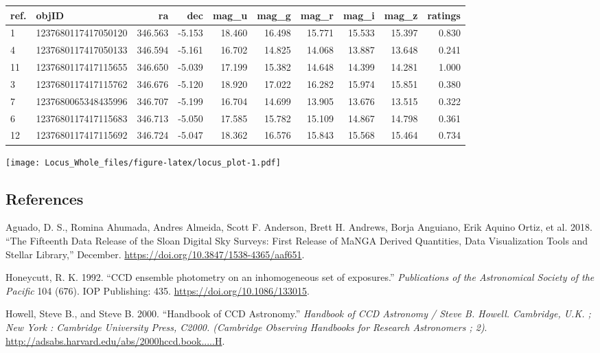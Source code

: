 \documentclass[]{elsarticle} %
\makeatletter
\def\maxwidth{\ifdim\Gin@nat@width>\linewidth\linewidth
\else\Gin@nat@width\fi}
\let\Oldincludegraphics\includegraphics
\renewcommand{\includegraphics}[1]{\Oldincludegraphics[width=\maxwidth]{#1}}
\makeatother
\begin{document}
\begin{tabular}{l|l|r|r|r|r|r|r|r|r}
\hline
ref. & objID & ra & dec & mag\_u & mag\_g & mag\_r & mag\_i & mag\_z & ratings\\
\hline
1 & 1237680117417050120 & 346.563 & -5.153 & 18.460 & 16.498 & 15.771 & 15.533 & 15.397 & 0.830\\
\hline
4 & 1237680117417050133 & 346.594 & -5.161 & 16.702 & 14.825 & 14.068 & 13.887 & 13.648 & 0.241\\
\hline
11 & 1237680117417115655 & 346.650 & -5.039 & 17.199 & 15.382 & 14.648 & 14.399 & 14.281 & 1.000\\
\hline
3 & 1237680117417115762 & 346.676 & -5.120 & 18.920 & 17.022 & 16.282 & 15.974 & 15.851 & 0.380\\
\hline
7 & 1237680065348435996 & 346.707 & -5.199 & 16.704 & 14.699 & 13.905 & 13.676 & 13.515 & 0.322\\
\hline
6 & 1237680117417115683 & 346.713 & -5.050 & 17.585 & 15.782 & 15.109 & 14.867 & 14.798 & 0.361\\
\hline
12 & 1237680117417115692 & 346.724 & -5.047 & 18.362 & 16.576 & 15.843 & 15.568 & 15.464 & 0.734\\
\hline
\end{tabular}

\texttt{[image: Locus\_Whole\_files/figure-latex/locus\_plot-1.pdf]}

\newpage

\hypertarget{references}{%
\subsection*{References}\label{references}}

\hypertarget{refs}{}
\leavevmode\hypertarget{ref-Aguado2018}{}%
Aguado, D. S., Romina Ahumada, Andres Almeida, Scott F. Anderson, Brett
H. Andrews, Borja Anguiano, Erik Aquino Ortiz, et al. 2018. ``The
Fifteenth Data Release of the Sloan Digital Sky Surveys: First Release
of MaNGA Derived Quantities, Data Visualization Tools and Stellar
Library,'' December. \url{https://doi.org/10.3847/1538-4365/aaf651}.

\leavevmode\hypertarget{ref-Honeycutt1992}{}%
Honeycutt, R. K. 1992. ``CCD ensemble photometry on an inhomogeneous set
of exposures.'' \emph{Publications of the Astronomical Society of the
Pacific} 104 (676). IOP Publishing: 435.
\url{https://doi.org/10.1086/133015}.

\leavevmode\hypertarget{ref-Howell2000}{}%
Howell, Steve B., and Steve B. 2000. ``Handbook of CCD Astronomy.''
\emph{Handbook of CCD Astronomy / Steve B. Howell. Cambridge, U.K. ; New
York : Cambridge University Press, C2000. (Cambridge Observing Handbooks
for Research Astronomers ; 2)}.
\url{http://adsabs.harvard.edu/abs/2000hccd.book.....H}.
\end{document}
